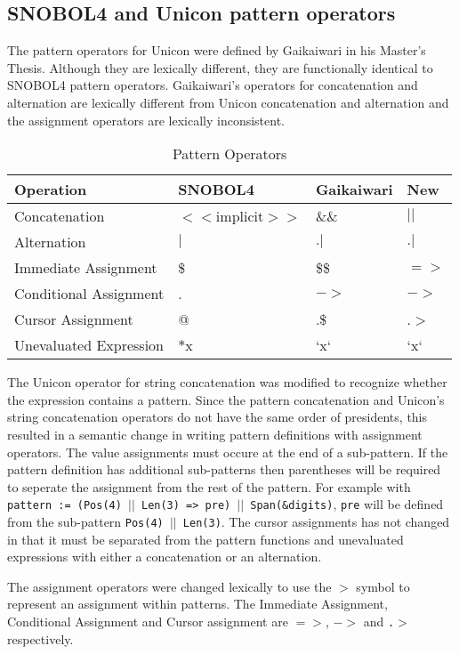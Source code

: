 \documentclass{article}
\begin{document}
\subsection{SNOBOL4 and Unicon pattern operators}
The pattern operators for Unicon were defined by Gaikaiwari in his Master's Thesis.  Although they are lexically different, they are functionally identical to SNOBOL4 pattern operators.  Gaikaiwari's operators for concatenation and alternation are lexically different from Unicon concatenation and alternation and the assignment operators are lexically inconsistent.  

\begin{table}[ht]
	\caption{Pattern Operators}
	\centering
	\begin{tabular}{|l|l|l|l|}
		\hline\hline
		Operation & SNOBOL4 & Gaikaiwari & New\\
		\hline
		Concatenation & $<<$implicit$>>$ & \&\& & $||$ \\
		Alternation & $|$ & $.|$ & $.|$ \\
		\hline
		Immediate Assignment & \$ & \$\$ & $=>$ \\
		Conditional Assignment & . & $->$ & $->$\\
		Cursor Assignment & @ & .\$ & .$>$ \\
		\hline
		Unevaluated Expression & $*$x & `x` & `x` \\
		\hline
	\end{tabular}
\end{table}
The Unicon operator for string concatenation was modified to recognize whether the expression contains a pattern.  Since the pattern concatenation and Unicon's string concatenation operators do not have the same order of presidents, this resulted in a semantic change in writing pattern definitions with assignment operators.  The value assignments must occure at the end of a sub-pattern.  If the pattern definition has additional sub-patterns then parentheses will be required to seperate the assignment from the rest of the pattern.  For example with \texttt{pattern := (Pos(4) $||$ Len(3) => pre) $||$ Span(\&digits)}, \texttt{pre} will be defined from the sub-pattern \texttt{Pos(4) $||$ Len(3)}.  The cursor assignments has not changed in that it must be separated from the pattern functions and unevaluated expressions with either a concatenation or an alternation.

The assignment operators were changed lexically to use the \texttt{$>$} symbol to represent an assignment within patterns.  The Immediate Assignment, Conditional Assignment and Cursor assignment are \texttt{$=>$}, \texttt{$->$} and \texttt{.$>$} respectively.
\end{document}
